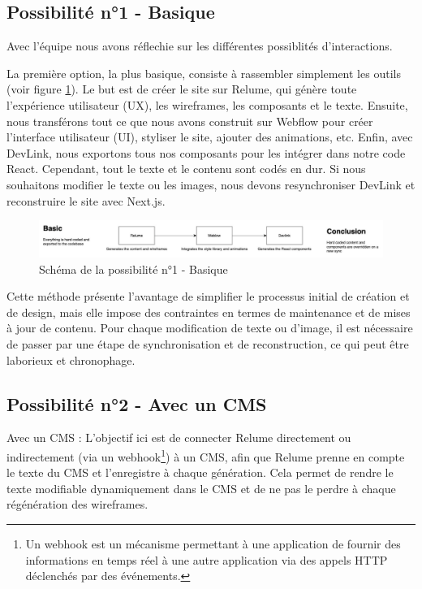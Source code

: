 \subsection{Possibilité n°1 - Basique}

Avec l'équipe nous avons réflechie sur les différentes possiblités d'interactions.

La première option, la plus basique, consiste à rassembler simplement les outils (voir figure \ref{fig: Schéma de la possibilité n°1 - Basique}). 
Le but est de créer le site sur Relume, qui génère toute l'expérience utilisateur (UX), les wireframes, les composants et le texte. Ensuite, nous transférons tout ce que nous avons construit sur Webflow pour créer l'interface utilisateur (UI), styliser le site, ajouter des animations, etc. Enfin, avec DevLink, nous exportons tous nos composants pour les intégrer dans notre code React. Cependant, tout le texte et le contenu sont codés en dur. Si nous souhaitons modifier le texte ou les images, nous devons resynchroniser DevLink et reconstruire le site avec Next.js.

\begin{figure}[h] 
  \centering
  \includegraphics[width=1\textwidth]{Includes/Images/connection1.png}
  \caption{Schéma de la possibilité n°1 - Basique}
  \label{fig: Schéma de la possibilité n°1 - Basique}
\end{figure} 

Cette méthode présente l'avantage de simplifier le processus initial de création et de design, mais elle impose des contraintes en termes de maintenance et de mises à jour de contenu. Pour chaque modification de texte ou d'image, il est nécessaire de passer par une étape de synchronisation et de reconstruction, ce qui peut être laborieux et chronophage.

\subsection{Possibilité n°2 - Avec un CMS}

Avec un CMS : L'objectif ici est de connecter Relume directement ou indirectement (via un webhook\footnote{Un webhook est un mécanisme permettant à une application de fournir des informations en temps réel à une autre application via des appels HTTP déclenchés par des événements.}) à un CMS, afin que Relume prenne en compte le texte du CMS et l'enregistre à chaque génération. Cela permet de rendre le texte modifiable dynamiquement dans le CMS et de ne pas le perdre à chaque régénération des wireframes.

